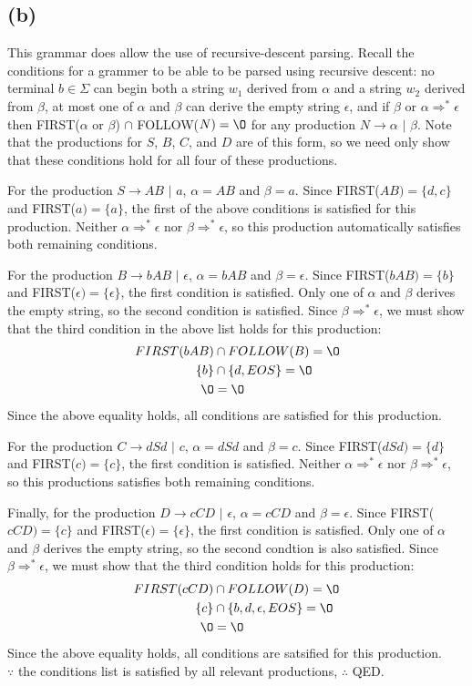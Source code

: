 \documentclass{article}
\begin{document}
	\subsection*{(b)}
	This grammar does allow the use of recursive-descent parsing. Recall the conditions for a grammer to be able to be parsed using recursive descent: no terminal $b \in \Sigma$ can begin both a string $w_1$ derived from $\alpha$ and a string $w_2$ derived from $\beta$, at most one of $\alpha$ and $\beta$ can derive the empty string $\epsilon$, and if $\beta$ or $\alpha \Rightarrow^* \epsilon$ then FIRST($\alpha$ or $\beta$) $\cap$ FOLLOW($N) = \O$ for any production $N \rightarrow \alpha$ $|$ $\beta$. Note that the productions for $S$, $B$, $C$, and $D$ are of this form, so we need only show that these conditions hold for all four of these productions.\par
	For the production $S \rightarrow AB$ $|$ $a$, $\alpha = AB$ and $\beta = a$. Since FIRST($AB) = \{d, c\}$ and FIRST($a) = \{a\}$, the first of the above conditions is satisfied for this production. Neither $\alpha \Rightarrow^* \epsilon$ nor $\beta \Rightarrow^* \epsilon$, so this production automatically satisfies both remaining conditions.\par
	For the production $B \rightarrow bAB$ $|$ $\epsilon$, $\alpha = bAB$ and $\beta = \epsilon$. Since FIRST($bAB) = \{b\}$ and FIRST($\epsilon) = \{\epsilon\}$, the first condition is satisfied. Only one of $\alpha$ and $\beta$ derives the empty string, so the second condition is satisfied. Since $\beta \Rightarrow^* \epsilon$, we must show that the third condition in the above list holds for this production:
		\begin{align*}
			FIRST(bAB) &\cap FOLLOW(B) = \O\\
			\{b\} &\cap \{d, EOS\} = \O\\
			\O &= \O
		\end{align*}
	Since the above equality holds, all conditions are satisfied for this production.\par
	For the production $C \rightarrow dSd$ $|$ $c$, $\alpha = dSd$ and $\beta = c$. Since FIRST($dSd) = \{d\}$ and FIRST($c) = \{c\}$, the first condition is satisfied. Neither $\alpha \Rightarrow^* \epsilon$ nor $\beta \Rightarrow^* \epsilon$, so this productions satisfies both remaining conditions.\par
	Finally, for the production $D \rightarrow cCD$ $|$ $\epsilon$, $\alpha = cCD$ and $\beta = \epsilon$. Since FIRST($cCD) = \{c\}$ and FIRST($\epsilon) = \{\epsilon\}$, the first condition is satisfied. Only one of $\alpha$ and $\beta$ derives the empty string, so the second condtion is also satisfied. Since $\beta \Rightarrow^* \epsilon$, we must show that the third condition holds for this production:
	\begin{align*}
		FIRST(cCD) &\cap FOLLOW(D) = \O\\
		\{c\} &\cap \{b, d, \epsilon, EOS\} = \O\\
		\O &= \O
	\end{align*}
Since the above equality holds, all conditions are satsified for this production.\\
$\because$ the conditions list is satisfied by all relevant productions, $\therefore$ QED.
\end{document}

